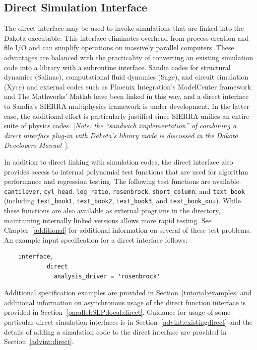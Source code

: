 \subsection{Direct Simulation Interface}\label{interfaces:direct}

The direct interface may be used to invoke
simulations that are linked into the Dakota executable. This
interface eliminates overhead from process creation and file I/O and
can simplify operations on massively parallel computers. These
advantages are balanced with the practicality of converting an
existing simulation code into a library with a subroutine
interface. Sandia codes for structural dynamics (Salinas),
computational fluid dynamics (Sage), and circuit simulation (Xyce) and
external codes such as Phoenix Integration's ModelCenter framework and
The Mathworks' Matlab have been linked in this way, and a direct
interface to Sandia's SIERRA multiphysics framework is under
development. In the latter case, the additional effort is particularly
justified since SIERRA unifies an entire suite of physics codes.
[\emph{Note: the ``sandwich implementation'' of combining a direct
interface plug-in with Dakota's library mode is discussed in the
Dakota Developers Manual~\cite{DevMan}}].

In addition to direct linking with simulation codes, the direct
interface also provides access to internal polynomial test functions
that are used for algorithm performance and regression testing. The
following test functions are available: \texttt{cantilever},
\texttt{cyl\_head}, \texttt{log\_ratio}, \texttt{rosenbrock},
\texttt{short\_column}, and \texttt{text\_book} (including
\texttt{text\_book1}, \texttt{text\_book2}, \texttt{text\_book3}, and
\texttt{text\_book\_ouu}). While these functions are also available
as external programs in the  directory,
maintaining internally linked versions allows more rapid testing. See
Chapter~\ref{additional} for additional information on several of
these test problems. An example input specification for a direct
interface follows:
\begin{small}
\begin{verbatim}
    interface,
            direct
              analysis_driver = 'rosenbrock'
\end{verbatim}
\end{small}

Additional specification examples are provided in
Section~\ref{tutorial:examples} and additional information on
asynchronous usage of the direct function interface is provided in
Section~\ref{parallel:SLP:local:direct}.  Guidance for usage of some
particular direct simulation interfaces is in
Section~\ref{advint:existingdirect} and the details of adding a
simulation code to the direct interface are provided in
Section~\ref{advint:direct}.

